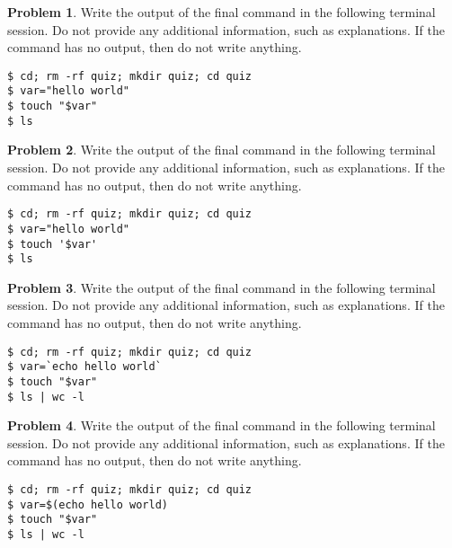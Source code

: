 \documentclass[10pt]{article}
\theoremstyle{definition}
\newtheorem{problem}{Problem}
\begin{document}
\begin{samepage}
\begin{problem}
Write the output of the final command in the following terminal session.
Do not provide any additional information,
such as explanations.
If the command has no output,
then do not write anything.

\end{problem}
\begin{lstlisting}
$ cd; rm -rf quiz; mkdir quiz; cd quiz
$ var="hello world"
$ touch "$var"
$ ls
\end{lstlisting}
\end{samepage}


\begin{samepage}
\begin{problem}
Write the output of the final command in the following terminal session.
Do not provide any additional information,
such as explanations.
If the command has no output,
then do not write anything.

\end{problem}
\begin{lstlisting}
$ cd; rm -rf quiz; mkdir quiz; cd quiz
$ var="hello world"
$ touch '$var'
$ ls
\end{lstlisting}
\end{samepage}


\begin{samepage}
\begin{problem}
Write the output of the final command in the following terminal session.
Do not provide any additional information,
such as explanations.
If the command has no output,
then do not write anything.

\end{problem}
\begin{lstlisting}
$ cd; rm -rf quiz; mkdir quiz; cd quiz
$ var=`echo hello world`
$ touch "$var"
$ ls | wc -l
\end{lstlisting}
\end{samepage}


\begin{samepage}
\begin{problem}
Write the output of the final command in the following terminal session.
Do not provide any additional information,
such as explanations.
If the command has no output,
then do not write anything.

\end{problem}
\begin{lstlisting}
$ cd; rm -rf quiz; mkdir quiz; cd quiz
$ var=$(echo hello world)
$ touch "$var"
$ ls | wc -l
\end{lstlisting}
\end{samepage}
\end{document}
